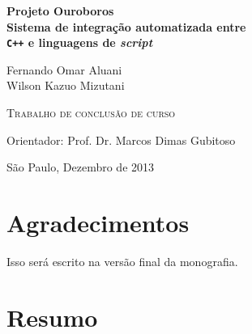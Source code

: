 \documentclass[11pt,twoside,a4paper]{book}
\begin{document}
\frontmatter 
\fancyhead[RO]{{\footnotesize\rightmark}\hspace{2em}\thepage}
\setcounter{tocdepth}{2}
\fancyhead[LE]{\thepage\hspace{2em}\footnotesize{\leftmark}}
\fancyhead[RE,LO]{}
\fancyhead[RO]{{\footnotesize\rightmark}\hspace{2em}\thepage}

\onehalfspacing  %

\thispagestyle{empty}
\begin{center}
  \vspace*{2.3cm}
  \textsf{\textbf{
    {\LARGE Projeto Ouroboros }\\
    {
      \Large Sistema de integração automatizada entre \\
      \texttt{C++} e linguagens de \emph{script}
    }
  }}
    
  \vspace*{1.2cm}
  \textsf{\Large{Fernando Omar Aluani}} \\
  \textsf{\Large{Wilson Kazuo Mizutani}}
  
  \vskip 2cm
  \textsc{Trabalho de conclusão de curso} 
  
  \vskip 10cm
  \textsf{Orientador: Prof. Dr. Marcos Dimas Gubitoso}

  \vskip 3cm
  
  \normalsize{São Paulo, Dezembro de 2013}
\end{center}


\chapter*{Agradecimentos}

Isso será escrito na versão final da monografia.

\chapter*{Resumo}
\end{document}
